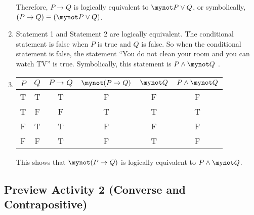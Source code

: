 \begin{enumerate}
Therefore, $P \to Q$ is logically equivalent to  $\mynot  P \vee Q$, or symbolically,  
$( {P \to Q} ) \equiv ( {\mynot  P \vee Q} )$.

\item Statement 1 and Statement 2 are logically equivalent.  The conditional statement is false when $P$ is true and $Q$ is false.  So when the conditional statement is false, the statement ``You do not clean your room and you can watch TV'' is true.  Symbolically, this statement is $P \wedge \mynot Q$ . 

\item 
\begin{tabular}[t]{| c | c || c | c | c | c |}  \hline
$P$  &  $Q$  &  $P \to Q$  &  $\mynot ( {P \to Q} )$  &  $\mynot Q$ &  $P \wedge \mynot Q$ \\ \hline
T  &  T  &  T  &  F  &  F & F \\ \hline
T  &  F  &  F  &  T  &  T & T \\ \hline
F  &  T  &  T  &  F  &  F & F  \\ \hline
F  &  F  &  T  &  F  &  T & F \\ \hline
\end{tabular}

This shows that  $\mynot  ( {P \to Q} )$  is logically equivalent to  
$P \wedge \mynot  Q$.

\end{enumerate}
\hbreak


\subsection*{Preview Activity 2 (Converse and Contrapositive)}

